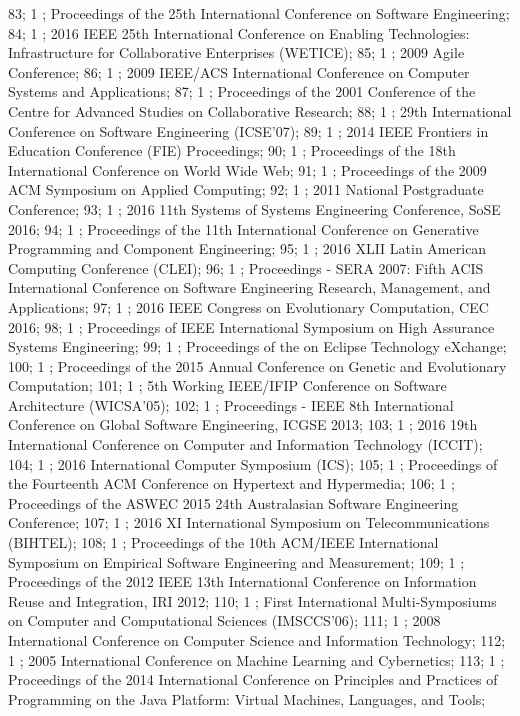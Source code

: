 83; 1 ; Proceedings of the 25th International Conference on Software Engineering; 
84; 1 ; 2016 IEEE 25th International Conference on Enabling Technologies: Infrastructure for Collaborative Enterprises (WETICE); 
85; 1 ; 2009 Agile Conference; 
86; 1 ; 2009 IEEE/ACS International Conference on Computer Systems and Applications; 
87; 1 ; Proceedings of the 2001 Conference of the Centre for Advanced Studies on Collaborative Research; 
88; 1 ; 29th International Conference on Software Engineering (ICSE'07); 
89; 1 ; 2014 IEEE Frontiers in Education Conference (FIE) Proceedings; 
90; 1 ; Proceedings of the 18th International Conference on World Wide Web; 
91; 1 ; Proceedings of the 2009 ACM Symposium on Applied Computing; 
92; 1 ; 2011 National Postgraduate Conference; 
93; 1 ; 2016 11th Systems of Systems Engineering Conference, SoSE 2016; 
94; 1 ; Proceedings of the 11th International Conference on Generative Programming and Component Engineering; 
95; 1 ; 2016 XLII Latin American Computing Conference (CLEI); 
96; 1 ; Proceedings - SERA 2007: Fifth ACIS International Conference on Software Engineering Research, Management, and Applications; 
97; 1 ; 2016 IEEE Congress on Evolutionary Computation, CEC 2016; 
98; 1 ; Proceedings of IEEE International Symposium on High Assurance Systems Engineering; 
99; 1 ; Proceedings of the on Eclipse Technology eXchange; 
100; 1 ; Proceedings of the 2015 Annual Conference on Genetic and Evolutionary Computation; 
101; 1 ; 5th Working IEEE/IFIP Conference on Software Architecture (WICSA'05); 
102; 1 ; Proceedings - IEEE 8th International Conference on Global Software Engineering, ICGSE 2013; 
103; 1 ; 2016 19th International Conference on Computer and Information Technology (ICCIT); 
104; 1 ; 2016 International Computer Symposium (ICS); 
105; 1 ; Proceedings of the Fourteenth ACM Conference on Hypertext and Hypermedia; 
106; 1 ; Proceedings of the ASWEC 2015 24th Australasian Software Engineering Conference; 
107; 1 ; 2016 XI International Symposium on Telecommunications (BIHTEL); 
108; 1 ; Proceedings of the 10th ACM/IEEE International Symposium on Empirical Software Engineering and Measurement; 
109; 1 ; Proceedings of the 2012 IEEE 13th International Conference on Information Reuse and Integration, IRI 2012; 
110; 1 ; First International Multi-Symposiums on Computer and Computational Sciences (IMSCCS'06); 
111; 1 ; 2008 International Conference on Computer Science and Information Technology; 
112; 1 ; 2005 International Conference on Machine Learning and Cybernetics; 
113; 1 ; Proceedings of the 2014 International Conference on Principles and Practices of Programming on the Java Platform: Virtual Machines, Languages, and Tools; 
